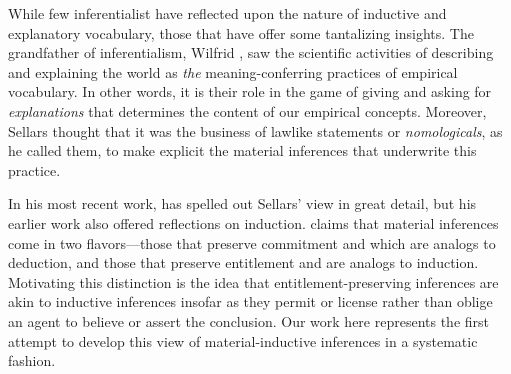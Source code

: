 \documentclass{article}
\theoremstyle{definition}
\theoremstyle{definition}
\theoremstyle{definition}
\theoremstyle{definition}
\theoremstyle{remark}
\theoremstyle{definition}
\theoremstyle{definition}
\begin{document}
While few inferentialist have reflected upon the nature of inductive and explanatory vocabulary, those that have offer some tantalizing insights. The grandfather of inferentialism, Wilfrid \textcite{Sellars1954,Sellars1963}, saw the scientific activities of describing and explaining the world as \textit{the} meaning-conferring practices of empirical vocabulary.  In other words, it is their role in the game of giving and asking for \textit{explanations} that determines the content of our empirical concepts. Moreover, Sellars thought that it was the business of lawlike statements or \textit{nomologicals}, as he called them, to make explicit the material inferences that underwrite this practice. 

In his most recent work, \textcite{Brandom2015} has spelled out Sellars' view in great detail, but his earlier work also offered reflections on induction. \textcite{Brandom1994,Brandom2008} claims that material inferences come in two flavors---those that preserve commitment and which are analogs to deduction, and those that preserve entitlement and are analogs to induction. Motivating this distinction is the idea that entitlement-preserving inferences are akin to inductive inferences insofar as they permit or license rather than oblige an agent to believe or assert the conclusion. Our work here represents the first attempt to develop this view of material-inductive inferences in a systematic fashion.
\end{document}
